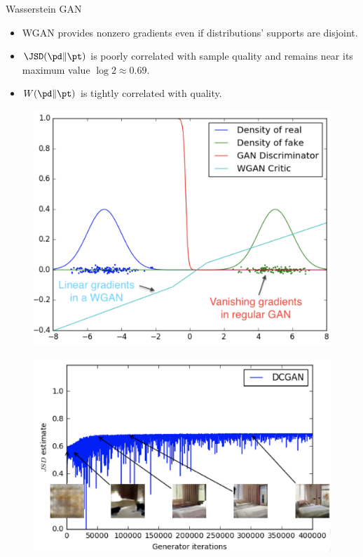 \documentclass{beamer}
\begin{document}
\begin{frame}{Wasserstein GAN}
	\vspace{-0.3cm}
	
	\begin{minipage}[t]{0.6\columnwidth}
		\begin{itemize}
			\item WGAN provides nonzero gradients even if distributions' supports are disjoint.
			\item $\JSD(\pd \| \pt)$ is poorly correlated with sample quality and remains near its maximum value $\log 2 \approx 0.69$.
			\item $W(\pd \| \pt)$ is tightly correlated with quality.
		\end{itemize}
	\end{minipage}%
	\begin{minipage}[t]{0.4\columnwidth}
		\begin{figure}
			\centering
			\includegraphics[width=\linewidth]{figs/wgan_toy}
		\end{figure}
	\end{minipage}
	\begin{minipage}[t]{0.5\columnwidth}
		\begin{figure}
			\centering
			\includegraphics[width=0.95\linewidth]{figs/dcgan_quality}

\end{figure}
\end{minipage}
\end{frame}
\end{document}
